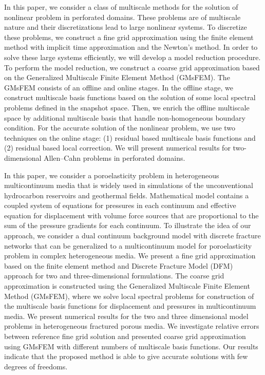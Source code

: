 \documentclass{aip-cp}
\begin{document}
In this paper, we consider a class of multiscale methods for the solution of nonlinear problem in perforated domains. These problems are of multiscale nature and their discretizations lead to large nonlinear systems. To discretize these problems, we construct a fine grid approximation using the finite element method with implicit time approximation and the Newton’s method. In order to solve these large systems efficiently, we will develop a model reduction procedure. To perform the model reduction, we construct a coarse grid approximation based on the Generalized Multiscale Finite Element Method (GMsFEM). The GMsFEM consists of an offline and online stages. In the offline stage, we construct multiscale basis functions based on the solution of some local spectral problems defined in the snapshot space. Then, we enrich the offline multiscale space by additional multiscale basis that handle non-homogeneous boundary condition. For the accurate solution of the nonlinear problem, we use two techniques on the online stage: (1) residual based multiscale basis functions and (2) residual based local correction. We will present numerical results for two-dimensional Allen–Cahn problems in perforated domains.

In this paper, we consider a poroelasticity problem in heterogeneous multicontinuum media that is widely used in simulations of the unconventional hydrocarbon reservoirs and geothermal fields. Mathematical model contains a coupled system of equations for pressures in each continuum and effective equation for displacement with volume force sources that are proportional to the sum of the pressure gradients for each continuum. To illustrate the idea of our approach, we consider a dual continuum background model with discrete fracture networks that can be generalized to a multicontinuum model for poroelasticity problem in complex heterogeneous media. We present a fine grid approximation based on the finite element method and Discrete Fracture Model (DFM) approach for two and three-dimensional formulations. The coarse grid approximation is constructed using the Generalized Multiscale Finite Element Method (GMsFEM), where we solve local spectral problems for construction of the multiscale basis functions for displacement and pressures in multicontinuum media. We present numerical results for the two and three dimensional model problems in heterogeneous fractured porous media. We investigate relative errors between reference fine grid solution and presented coarse grid approximation using GMsFEM with different numbers of multiscale basis functions. Our results indicate that the proposed method is able to give accurate solutions with few degrees of freedoms.
\end{document}
